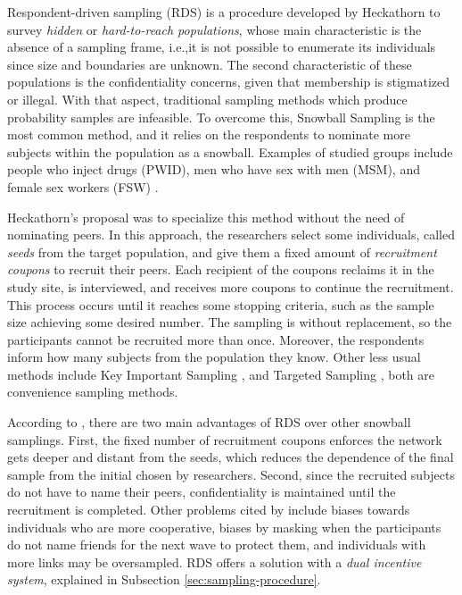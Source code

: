 Respondent-driven sampling (RDS) is a procedure developed by Heckathorn
\cite[]{heckathorn1997} to survey {\em hidden} or {\em hard-to-reach
populations}, whose main characteristic is the absence of a sampling frame,
i.e.,it is not possible to enumerate its individuals since size and boundaries
are unknown. The second characteristic of these populations is the
confidentiality concerns, given that membership is stigmatized or illegal.
With that aspect, traditional sampling methods which produce probability
samples are infeasible. To overcome this, Snowball Sampling \cite[]{goodman1961}
is the most common method, and it relies on the respondents to nominate more 
subjects within the population as a snowball. Examples of studied groups
include people who inject drugs (PWID), men who have sex with men (MSM), and
female sex workers (FSW) \cite[p. 66]{gile2018methods}. 

Heckathorn's proposal \citeyear{heckathorn1997} was to specialize this method without the need of
nominating peers. In this approach, the researchers select some individuals,
called {\em seeds} from the target population, and give them a fixed amount of
{\em recruitment coupons} to recruit their peers. Each recipient of the coupons
reclaims it in the study site, is interviewed, and receives more coupons to
continue the recruitment. This process occurs until it reaches some stopping
criteria, such as the sample size achieving some desired number. The sampling
is without replacement, so the participants cannot be recruited more than
once. Moreover, the respondents inform how many subjects from the population
they know. Other less usual methods include Key Important Sampling \cite{deaux-callaghan1985}, 
and Targeted Sampling \cite{watters-biernacki1989}, both are convenience
sampling methods. 

According to \textcite[p. 66]{gile2018methods}, there are two main advantages
of RDS over other snowball samplings. First, the fixed number of recruitment
coupons enforces the network gets deeper and distant from the seeds, which
reduces the dependence of the final sample from the initial chosen by
researchers. Second, since the recruited subjects do not have to name their
peers, confidentiality is maintained until the recruitment is completed.
Other problems cited by \textcite[p. 175]{heckathorn1997} include biases
towards individuals who are more cooperative, biases by masking when the
participants do not name friends for the next wave to protect them, and
individuals with more links may be oversampled. RDS offers a solution with a
{\em dual incentive system}, explained in Subsection
\ref{sec:sampling-procedure}. 

